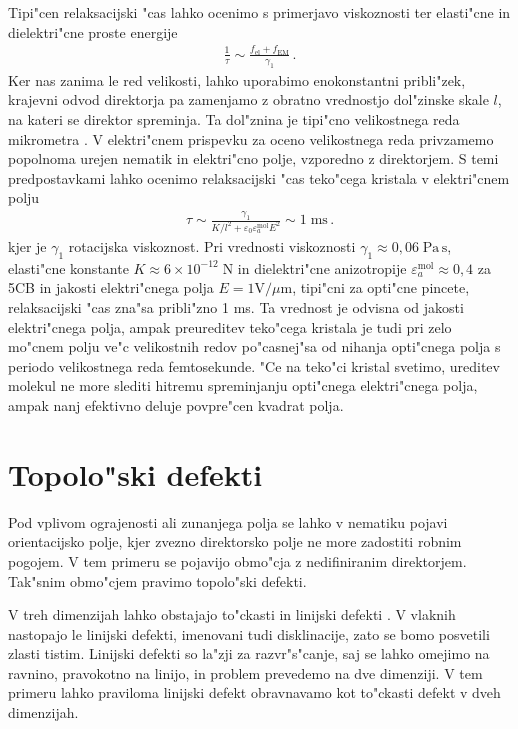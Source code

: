 \documentclass[12pt,twoside,openright,final,a4paper]{report}
\begin{document}
Tipi"cen relaksacijski "cas lahko ocenimo s primerjavo viskoznosti ter elasti"cne in dielektri"cne proste energije
\begin{align}
 \frac{1}{\tau} \sim \frac{f_\mathrm{el} + f_\mathrm{EM}}{\gamma_1}\,.
\end{align}
Ker nas zanima le red velikosti, lahko uporabimo enokonstantni pribli"zek, krajevni odvod direktorja pa zamenjamo z obratno vrednostjo dol"zinske skale $l$, na kateri se direktor spreminja. 
Ta dol"znina je tipi"cno velikostnega reda mikrometra \cite{kleman}. 
V elektri"cnem prispevku za oceno velikostnega reda privzamemo popolnoma urejen nematik in elektri"cno polje, vzporedno z direktorjem. 
S temi predpostavkami lahko ocenimo relaksacijski "cas teko"cega kristala v elektri"cnem polju
\begin{align}
 \tau \sim \frac{\gamma_1}{K/l^2 + \varepsilon_0 \varepsilon_a^{\mathrm{mol}} E^2 } \sim 1\;\mathrm{ms}\,.
\end{align}
kjer je $\gamma_1$ rotacijska viskoznost. 
Pri vrednosti viskoznosti $\gamma_1 \approx 0,\!06 \; \mathrm{Pa\,s}$, elasti"cne konstante $K \approx 6\times 10^{-12} \; \mathrm{N}$ in dielektri"cne anizotropije $\varepsilon_a^{\mathrm{mol}} \approx 0,\!4$ za 5CB \cite{diploma-miha,kolicniki} in jakosti elektri"cnega polja $E = 1\mathrm{V}/\mu\mathrm{m}$, tipi"cni za opti"cne pincete, relaksacijski "cas zna"sa pribli"zno 1 ms. 
Ta vrednost je odvisna od jakosti elektri"cnega polja, ampak preureditev teko"cega kristala je tudi pri zelo mo"cnem polju ve"c velikostnih redov po"casnej"sa od nihanja opti"cnega polja s periodo velikostnega reda femtosekunde. 
"Ce na teko"ci kristal svetimo, ureditev molekul ne more slediti hitremu spreminjanju opti"cnega elektri"cnega polja, ampak nanj efektivno deluje povpre"cen kvadrat polja. 

\section{Topolo"ski defekti}

Pod vplivom ograjenosti ali zunanjega polja se lahko v nematiku pojavi orientacijsko polje, kjer zvezno direktorsko polje ne more zadostiti robnim pogojem. 
V tem primeru se pojavijo obmo"cja z nedifiniranim direktorjem. 
Tak"snim obmo"cjem pravimo topolo"ski defekti. 

V treh dimenzijah lahko obstajajo to"ckasti in linijski defekti \cite{degennes,kleman}. 
V vlaknih nastopajo le linijski defekti, imenovani tudi disklinacije, zato se bomo posvetili zlasti tistim. 
Linijski defekti so la"zji za razvr"s"canje, saj se lahko omejimo na ravnino, pravokotno na linijo, in problem prevedemo na dve dimenziji. 
V tem primeru lahko praviloma linijski defekt obravnavamo kot to"ckasti defekt v dveh dimenzijah. 
\end{document}
